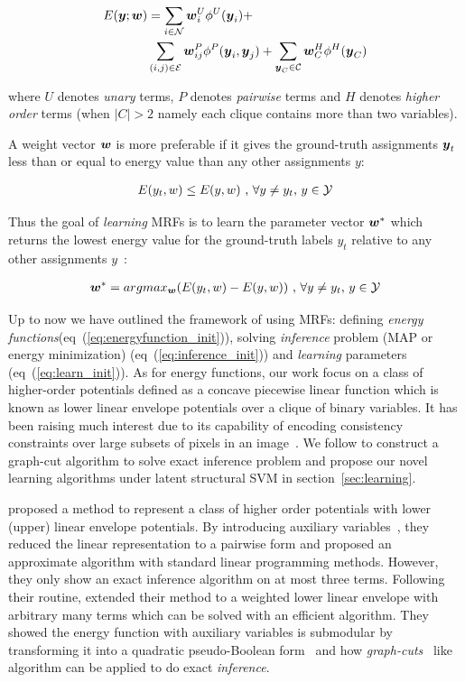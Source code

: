 \documentclass[sigconf, anonymous, review]{acmart}
\renewcommand{\citename}{\citet}
\renewcommand{\cite}{\citep}
\begin{document}
\begin{align}
  \label{eq:energyfunction_UPH}
  E({\boldsymbol{y}};{\boldsymbol{w}})&=\sum_{i\in {\cal N}}{{\boldsymbol{w}}_i^U\phi^U({\boldsymbol{y}}_i)}+ \notag\\
  & \sum_{(i,j)\in {\cal E}}{{\boldsymbol{w}}_{ij}^P\phi^P({\boldsymbol{y}}_i,{\boldsymbol{y}}_j)}+
  \sum_{{\boldsymbol{y}}_C\in {\cal C}}{{\boldsymbol{w}}_C^H\phi^H({\boldsymbol{y}}_C)}
\end{align}

\noindent where $U$ denotes \emph{unary} terms, $P$ denotes
\emph{pairwise} terms and $H$ denotes \emph{higher order} terms
(when $|C|>2$ namely each clique contains more than two
variables).

A weight vector ${\boldsymbol{w}}$ is more preferable if it gives the
ground-truth assignments ${\boldsymbol{y}}_t$ less than or equal to energy
value than any other assignments $y$:

\begin{align}
E(y_t,w)\leq E(y,w)~ \text{,~}\forall y \neq y_t
\text{,~} y\in {\cal Y}
\end{align}


Thus the goal of \emph{learning} MRFs is to learn the parameter
vector ${\boldsymbol{w}}^*$ which returns the lowest energy value for the
ground-truth labels $y_t$ relative to any other assignments
$y$~\cite{Szummer:ECCV08}:

\begin{align}
  \label{eq:learn_init}
{\boldsymbol{w}}^* = argmax_{{\boldsymbol{w}}}(E(y_t,w)-E(y,w))~ \text{,~}\forall y \neq y_t
\text{,~} y\in {\cal Y}
\end{align}

Up to now we have outlined the framework of using MRFs: defining
\emph{energy functions}(eq~(\ref{eq:energyfunction_init})),
solving \emph{inference} problem (MAP or energy minimization)
(eq~(\ref{eq:inference_init})) and \emph{learning} parameters
(eq~(\ref{eq:learn_init})). As for energy functions, our work
focus on a class of higher-order potentials defined as a concave
piecewise linear function which is known as lower linear envelope
potentials over a clique of binary variables. It has been raising
much interest due to its capability of encoding consistency
constraints over large subsets of pixels in an
image~\cite{Kohli:CVPR07,Nowozin:2011}. We follow
\citename{gouldlearning} to construct a graph-cut algorithm to
solve exact inference problem and propose our novel learning
algorithms under latent structural SVM in
section~\ref{sec:learning}.

\citename{kohli2009robust} proposed a method to represent a class
of higher order potentials with lower (upper) linear envelope
potentials. By introducing auxiliary
variables~\cite{Kohli:CVPR10}, they reduced the linear
representation to a pairwise form and proposed an approximate
algorithm with standard linear programming methods. However, they
only show an exact inference algorithm on at most three terms.
Following their routine, \citename{gouldlearning} extended their
method to a weighted lower linear envelope with arbitrary many
terms which can be solved with an efficient algorithm. They
showed the energy function with auxiliary variables is submodular
by transforming it into a quadratic pseudo-Boolean
form~\cite{Boros:MATH02} and how
\emph{graph-cuts}~\cite{Hammer:1965, Boykov:ICCV01, Freedman:CVPR05} like
algorithm can be applied to do exact \emph{inference}.
\end{document}
